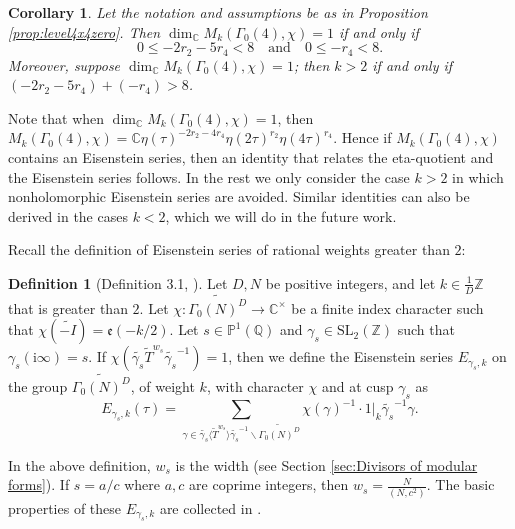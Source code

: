 \documentclass[12pt]{amsart}
\numberwithin{equation}{section}
\theoremstyle{plain}
\newtheorem{coro}[thm]{Corollary}
\theoremstyle{definition}
\newtheorem{deff}[thm]{Definition}
\theoremstyle{remark}
\newcommand\rmi{\mathrm{i}}
\newcommand\etp[1]{\mathfrak{e}\left(#1\right)}
\newcommand\numZ{\mathbb{Z}}
\newcommand\numC{\mathbb{C}}
\newcommand\projQ{\mathbb{P}^1(\mathbb{Q})}
\newcommand\slZ{\mathrm{SL}_2(\mathbb{Z})}
\newcommand\Dcover[2]{\widetilde{#1^{#2}}}
\begin{document}
\begin{coro}
\label{coro:level4x4zeroDim0}
Let the notation and assumptions be as in Proposition \ref{prop:level4x4zero}. Then $\dim_\numC M_k(\Gamma_0(4), \chi)=1$ if and only if
\begin{equation*}
0\leq-2r_2-5r_4<8\quad\text{and}\quad0\leq-r_4<8.
\end{equation*}
Moreover, suppose $\dim_\numC M_k(\Gamma_0(4), \chi)=1$; then $k>2$ if and only if $(-2r_2-5r_4)+(-r_4)>8$.
\end{coro}
Note that when $\dim_\numC M_k(\Gamma_0(4), \chi)=1$, then $M_k(\Gamma_0(4), \chi)=\numC\eta(\tau)^{-2r_2-4r_4}\eta(2\tau)^{r_2}\eta(4\tau)^{r_4}$. Hence if $M_k(\Gamma_0(4), \chi)$ contains an Eisenstein series, then an identity that relates the eta-quotient and the Eisenstein series follows. In the rest we only consider the case $k>2$ in which nonholomorphic Eisenstein series are avoided. Similar identities can also be derived in the cases $k<2$, which we will do in the future work.

Recall the definition of Eisenstein series of rational weights greater than $2$:
\begin{deff}[Definition 3.1, \cite{Zhu23}]
\label{deff:Eis}
Let $D,N$ be positive integers, and let $k\in\frac{1}{D}\numZ$ that is greater than $2$. Let $\chi\colon \Dcover{\Gamma_0(N)}{D} \to \numC^\times$ be a finite index character such that $\chi(\widetilde{-I})=\etp{-k/2}$. Let $s \in \projQ$ and $\gamma_s \in \slZ$ such that $\gamma_s(\rmi\infty)=s$. If $\chi(\widetilde{\gamma_s}\widetilde{T}^{w_{s}}\widetilde{\gamma_s}^{-1})=1$, then we define the Eisenstein series $E_{\gamma_s,k}$ on the group $\Dcover{\Gamma_0(N)}{D}$, of weight $k$, with character $\chi$ and at cusp $\gamma_s$ as
\begin{equation*}
E_{\gamma_s,k}(\tau)=\sum_{\gamma \in \widetilde{\gamma_s}\langle \widetilde{T}^{w_{s}}\rangle\widetilde{\gamma_s}^{-1}\backslash\Dcover{\Gamma_0(N)}{D}}\chi(\gamma)^{-1}\cdot 1\vert_k\widetilde{\gamma_s}^{-1}\gamma.
\end{equation*}
\end{deff}
In the above definition, $w_{s}$ is the width (see Section \ref{sec:Divisors of modular forms}). If $s=a/c$ where $a,c$ are coprime integers, then $w_s=\frac{N}{(N,c^2)}$. The basic properties of these $E_{\gamma_s,k}$ are collected in \cite[Section 3]{Zhu23}.
\end{document}
